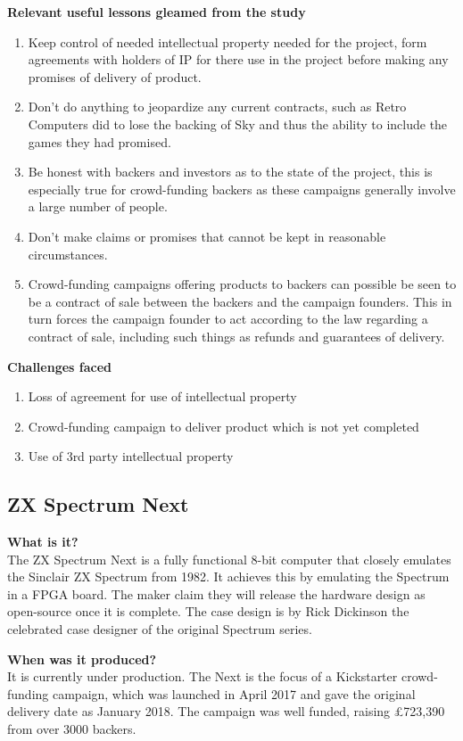 \textbf{Relevant useful lessons gleamed from the study}
\begin{enumerate}
\item Keep control of needed intellectual property needed for the project, form agreements with holders of IP for there use in the project before making any promises of delivery of product. 
\item Don't do anything to jeopardize any current contracts, such as Retro Computers did to lose the backing of Sky and thus the ability to include the games they had promised.
\item Be honest with backers and investors as to the state of the project, this is especially true for crowd-funding backers as these campaigns generally involve a large number of people.
\item Don't make claims or promises that cannot be kept in reasonable circumstances.
\item Crowd-funding campaigns offering products to backers can possible be seen to be a contract of sale between the backers and the campaign founders. This in turn forces the campaign founder to act according to the law regarding a contract of sale, including such things as refunds and guarantees of delivery.
\end{enumerate}

\textbf{Challenges faced}
\begin{enumerate}
\item Loss of agreement for use of intellectual property
\item Crowd-funding campaign to deliver product which is not yet completed 
\item Use of 3rd party intellectual property 
\end{enumerate}

\subsection{ZX Spectrum Next}
\textbf{What is it?}\\
The ZX Spectrum Next is a fully functional 8-bit computer that closely emulates the Sinclair ZX Spectrum from 1982. It achieves this by emulating the Spectrum in a FPGA board. The maker claim they will release the hardware design as open-source once it is complete. The case design is by Rick Dickinson the celebrated case designer of the original Spectrum series.

\textbf{When was it produced?}\\
It is currently under production. The Next is the focus of a Kickstarter crowd-funding campaign, which was launched in April 2017 and gave the original delivery date as January 2018. The campaign was well funded, raising £723,390 from over 3000 backers.

